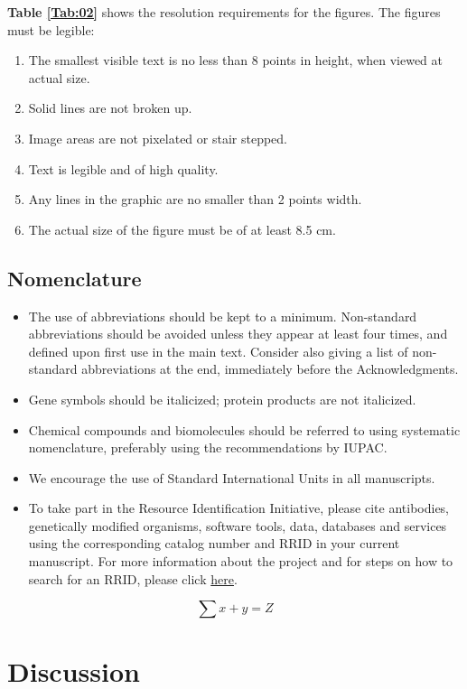 \documentclass{frontiersSCNS} %
\begin{document}
\textbf{Table \ref{Tab:02}} shows the resolution requirements for the figures. The figures must be legible:
\begin{enumerate}
\item The smallest visible text is no less than 8 points in height, when viewed at actual size.
\item Solid lines are not broken up.
\item Image areas are not pixelated or stair stepped.
\item Text is legible and of high quality.
\item Any lines in the graphic are no smaller than 2 points width.
\item The actual size of the figure must be of at least 8.5 cm.
\end{enumerate}

\subsection{Nomenclature}
\begin{itemize}
\item The use of abbreviations should be kept to a minimum. Non-standard abbreviations should be avoided unless they appear at least four times, and defined upon first use in the main text. Consider also giving a list of non-standard abbreviations at the end, immediately before the Acknowledgments.
\item Gene symbols should be italicized; protein products are not italicized.
\item Chemical compounds and biomolecules should be referred to using systematic nomenclature, preferably using the recommendations by IUPAC.
\item We encourage the use of Standard International Units in all manuscripts.
\item To take part in the Resource Identification Initiative, please cite antibodies, genetically modified organisms, software tools, data, databases and services using the corresponding catalog number and RRID in your current manuscript. For more information about the project and for steps on how to search for an RRID, please click \href{http://www.frontiersin.org/files/pdf/letter_to_author.pdf}{here}.
\end{itemize}

\begin{equation}
\sum x+ y =Z\label{eq:01}
\end{equation}

\section{Discussion}
\end{document}
